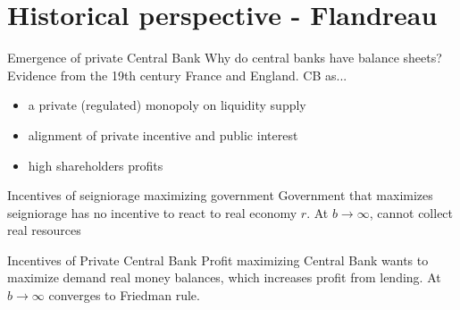 \documentclass{beamer}
\begin{document}
\section{Historical perspective - Flandreau}

\begin{frame}{Emergence of private Central Bank}
    Why do central banks have balance sheets?
    Evidence from the 19th century France and England. CB as...
    \vfill
    \begin{itemize}
        \setlength\itemsep{1em}
        \item a private (regulated) monopoly on liquidity supply
        \item alignment of private incentive and public interest
        \item high shareholders profits
    \end{itemize}
\end{frame}

\begin{frame}{Incentives of seigniorage maximizing government}
    Government that maximizes seigniorage has no incentive to react to real economy $r$. At $b\xrightarrow{} \infty$, cannot collect real resources
    \vfill
    \centering
\end{frame}

\begin{frame}{Incentives of Private Central Bank}
    Profit maximizing Central Bank wants to maximize demand real money balances, which increases profit from lending. At $b\xrightarrow{} \infty$ converges to Friedman rule.
    \vfill
    \centering
\end{frame}
\end{document}

